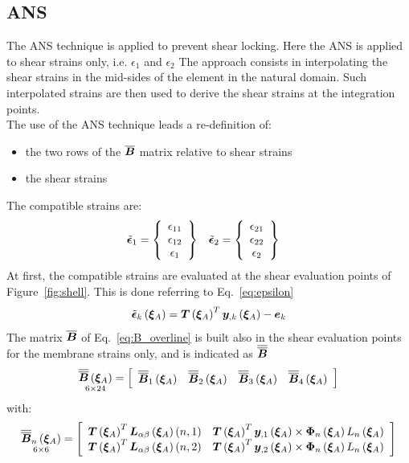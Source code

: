 \subsection{ANS}
The ANS technique is applied to prevent shear locking. Here the ANS is applied to shear strains only, i.e. $\epsilon_{1}$ and  $\epsilon_{2}$ The approach consists in interpolating the shear strains in the mid-sides of the element in the natural domain. Such interpolated strains are then used to derive the shear strains at the integration points.\\
The use of the ANS technique leads a re-definition of:
\begin{itemize}
	\item the two rows of the $\overline{\TT{B}}$ matrix relative to shear strains
	\item the shear strains
\end{itemize}
The compatible strains are:
\begin{align}
\tilde{\T{\epsilon}}_1 & =
\cubr{\vvect{c}{
\epsilon_{11} \\
\epsilon_{12} \\
\epsilon_{1}
}}
&
\tilde{\T{\epsilon}}_2 & =
\cubr{\vvect{c}{
\epsilon_{21} \\
\epsilon_{22} \\
\epsilon_{2}
}}
\end{align}
At first, the compatible strains are evaluated at the shear evaluation points of Figure~\ref{fig:shell}. This is done referring to Eq.~\ref{eq:epsilon}
\begin{equation}
\tilde{\T{\epsilon}}_k \valxiA  =
\TT{T} \valxiA ^T \T{y}_{,k} \valxiA - \T{e}_k
\end{equation}
The matrix $\overline{\TT{B}}$ of Eq.~\ref{eq:B_overline} is built also in the shear evaluation points for the membrane strains only, and is indicated as $\overline{\overline{\TT{B}}}$
\begin{equation}
\underset{ 6 \times 24 }{\overline{\overline{\TT{B}}} \valxiA} =
\sqbr{ \matr{ c c c c  }{
\overline{\overline{\TT{B}}}_1 \valxiA & \overline{\overline{\TT{B}}}_2 \valxiA & \overline{\overline{\TT{B}}}_3 \valxiA & \overline{\overline{\TT{B}}}_4 \valxiA
}}
\end{equation}
with:
\begin{equation}
\underset{ 6 \times 6 }{\overline{\overline{\TT{B}}}_n \valxiA} =
\sqbr{ \matr{ c c  }{
\TT{T} \valxiA ^ T \TT{L}_{\alpha \beta} \valxiA \plbr{n,1} & \TT{T} \valxiA^T \T{y}_{,1} \valxiA \times \TT{\Phi}_{n} \valxiA L_{n}  \valxiA \\
\TT{T} \valxiA ^ T \TT{L}_{\alpha \beta} \valxiA \plbr{n,2} & \TT{T} \valxiA^T \T{y}_{,2} \valxiA \times \TT{\Phi}_{n} \valxiA L_{n}  \valxiA
}}
\end{equation}
